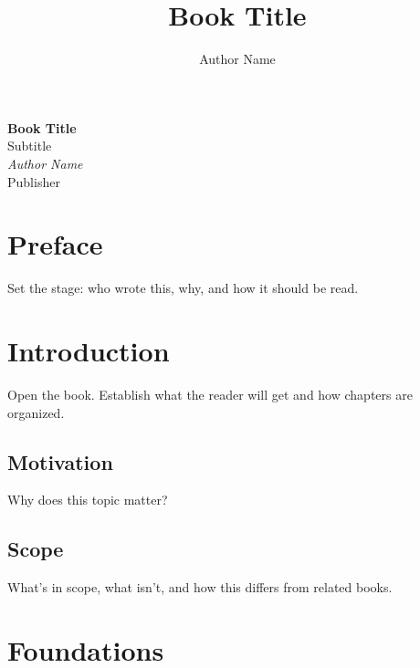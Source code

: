 \documentclass[11pt,twoside,openright]{book}
\title{Book Title}
\author{Author Name}
\date{\the\year}
\theoremstyle{plain}
\theoremstyle{definition}
\theoremstyle{remark}
\begin{document}
\frontmatter

\thispagestyle{empty}
\begin{center}
  \vspace*{1in}
  {\Huge\bfseries\color{chapterblue} Book Title} \\[0.5cm]
  {\LARGE Subtitle} \\[2cm]
  {\Large\itshape Author Name} \\[3cm]
  {\large Publisher} \\[0.3cm]
  {\large \the\year}
\end{center}
\cleardoublepage

\tableofcontents
\cleardoublepage

\chapter*{Preface}
Set the stage: who wrote this, why, and how it should be read.

\cleardoublepage

\mainmatter

\chapter{Introduction}
\label{ch:introduction}

Open the book. Establish what the reader will get and how chapters are organized.

\section{Motivation}
Why does this topic matter?

\section{Scope}
What's in scope, what isn't, and how this differs from related books.

\chapter{Foundations}
\label{ch:foundations}
\end{document}
